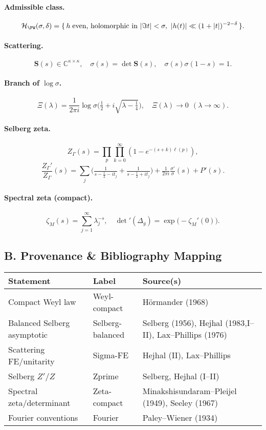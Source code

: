 \paragraph{Admissible class.}
\[
  \mathcal H_{\PW}(\sigma,\delta)=\{\,h \;\text{even, holomorphic in } |\Im t|<\sigma,\ |h(t)|\ll (1+|t|)^{-2-\delta}\,\}.
\]

\paragraph{Scattering.}
\[
  \mathbf S(s)\in\mathbb C^{\kappa\times\kappa}, \quad \sigma(s)=\det\mathbf S(s), \quad \sigma(s)\sigma(1-s)=1.
\]

\paragraph{Branch of $\log\sigma$.}
\[
  \Xi(\lambda)=\frac{1}{2\pi i}\log\sigma\!\Big(\tfrac12+i\sqrt{\lambda-\tfrac14}\Big), \quad \Xi(\lambda)\to 0 \ \ (\lambda\to\infty).
\]

\paragraph{Selberg zeta.}
\[
  Z_\Gamma(s)=\prod_{p}\prod_{k=0}^\infty \left(1-e^{-(s+k)\ell(p)}\right),
\]
\[
  \frac{Z_\Gamma'}{Z_\Gamma}(s)=\sum_j\Big(\tfrac{1}{s-\tfrac12-it_j}+\tfrac{1}{s-\tfrac12+it_j}\Big)+\tfrac{1}{2\pi i}\tfrac{\sigma'}{\sigma}(s)+P'(s).
\]

\paragraph{Spectral zeta (compact).}
\[
  \zeta_M(s)=\sum_{j=1}^\infty \lambda_j^{-s}, \quad 
  \det{}'(\Delta_g)=\exp\!\big(-\zeta_M'(0)\big).
\]


\subsection*{B. Provenance \& Bibliography Mapping}
\label{subsec:provenance-final}

\begin{center}
\renewcommand{\arraystretch}{1.15}
\begin{tabular}{lll}
\toprule
\textbf{Statement} & \textbf{Label} & \textbf{Source(s)} \\
\midrule
Compact Weyl law & Weyl-compact & Hörmander (1968) \\
Balanced Selberg asymptotic & Selberg-balanced & Selberg (1956), Hejhal (1983,I–II), Lax–Phillips (1976) \\
Scattering FE/unitarity & Sigma-FE & Hejhal (II), Lax–Phillips \\
Selberg $Z'/Z$ & Zprime & Selberg, Hejhal (I–II) \\
Spectral zeta/determinant & Zeta-compact & Minakshisundaram–Pleijel (1949), Seeley (1967) \\
Fourier conventions & Fourier & Paley–Wiener (1934) \\
\bottomrule
\end{tabular}
\end{center}

